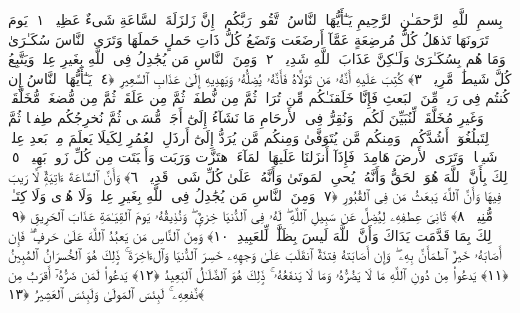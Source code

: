 
  
    
  
    
    

\nopagebreak
  بِسمِ ٱللَّهِ ٱلرَّحمَـٰنِ ٱلرَّحِيمِ
  يَـٰٓأَيُّهَا ٱلنَّاسُ ٱتَّقُوا۟ رَبَّكُم ۚ إِنَّ زَلزَلَةَ ٱلسَّاعَةِ شَىءٌ عَظِيمٌۭ ﴿١﴾
 يَومَ تَرَونَهَا تَذهَلُ كُلُّ مُرضِعَةٍ عَمَّآ أَرضَعَت وَتَضَعُ كُلُّ ذَاتِ حَملٍ حَملَهَا وَتَرَى ٱلنَّاسَ سُكَـٰرَىٰ وَمَا هُم بِسُكَـٰرَىٰ وَلَـٰكِنَّ عَذَابَ ٱللَّهِ شَدِيدٌۭ ﴿٢﴾
 وَمِنَ ٱلنَّاسِ مَن يُجَٰدِلُ فِى ٱللَّهِ بِغَيرِ عِلمٍۢ وَيَتَّبِعُ كُلَّ شَيطَٰنٍۢ مَّرِيدٍۢ ﴿٣﴾
 كُتِبَ عَلَيهِ أَنَّهُۥ مَن تَوَلَّاهُ فَأَنَّهُۥ يُضِلُّهُۥ وَيَهدِيهِ إِلَىٰ عَذَابِ ٱلسَّعِيرِ ﴿٤﴾
 يَـٰٓأَيُّهَا ٱلنَّاسُ إِن كُنتُم فِى رَيبٍۢ مِّنَ ٱلبَعثِ فَإِنَّا خَلَقنَـٰكُم مِّن تُرَابٍۢ ثُمَّ مِن نُّطفَةٍۢ ثُمَّ مِن عَلَقَةٍۢ ثُمَّ مِن مُّضغَةٍۢ مُّخَلَّقَةٍۢ وَغَيرِ مُخَلَّقَةٍۢ لِّنُبَيِّنَ لَكُم ۚ وَنُقِرُّ فِى ٱلأَرحَامِ مَا نَشَآءُ إِلَىٰٓ أَجَلٍۢ مُّسَمًّۭى ثُمَّ نُخرِجُكُم طِفلًۭا ثُمَّ لِتَبلُغُوٓا۟ أَشُدَّكُم ۖ وَمِنكُم مَّن يُتَوَفَّىٰ وَمِنكُم مَّن يُرَدُّ إِلَىٰٓ أَرذَلِ ٱلعُمُرِ لِكَيلَا يَعلَمَ مِنۢ بَعدِ عِلمٍۢ شَيـًۭٔا ۚ وَتَرَى ٱلأَرضَ هَامِدَةًۭ فَإِذَآ أَنزَلنَا عَلَيهَا ٱلمَآءَ ٱهتَزَّت وَرَبَت وَأَنۢبَتَت مِن كُلِّ زَوجٍۭ بَهِيجٍۢ ﴿٥﴾
 ذَٟلِكَ بِأَنَّ ٱللَّهَ هُوَ ٱلحَقُّ وَأَنَّهُۥ يُحىِ ٱلمَوتَىٰ وَأَنَّهُۥ عَلَىٰ كُلِّ شَىءٍۢ قَدِيرٌۭ ﴿٦﴾
 وَأَنَّ ٱلسَّاعَةَ ءَاتِيَةٌۭ لَّا رَيبَ فِيهَا وَأَنَّ ٱللَّهَ يَبعَثُ مَن فِى ٱلقُبُورِ ﴿٧﴾
 وَمِنَ ٱلنَّاسِ مَن يُجَٰدِلُ فِى ٱللَّهِ بِغَيرِ عِلمٍۢ وَلَا هُدًۭى وَلَا كِتَـٰبٍۢ مُّنِيرٍۢ ﴿٨﴾
 ثَانِىَ عِطفِهِۦ لِيُضِلَّ عَن سَبِيلِ ٱللَّهِ ۖ لَهُۥ فِى ٱلدُّنيَا خِزىٌۭ ۖ وَنُذِيقُهُۥ يَومَ ٱلقِيَـٰمَةِ عَذَابَ ٱلحَرِيقِ ﴿٩﴾
 ذَٟلِكَ بِمَا قَدَّمَت يَدَاكَ وَأَنَّ ٱللَّهَ لَيسَ بِظَلَّٰمٍۢ لِّلعَبِيدِ ﴿١٠﴾
 وَمِنَ ٱلنَّاسِ مَن يَعبُدُ ٱللَّهَ عَلَىٰ حَرفٍۢ ۖ فَإِن أَصَابَهُۥ خَيرٌ ٱطمَأَنَّ بِهِۦ ۖ وَإِن أَصَابَتهُ فِتنَةٌ ٱنقَلَبَ عَلَىٰ وَجهِهِۦ خَسِرَ ٱلدُّنيَا وَٱلءَاخِرَةَ ۚ ذَٟلِكَ هُوَ ٱلخُسرَانُ ٱلمُبِينُ ﴿١١﴾
 يَدعُوا۟ مِن دُونِ ٱللَّهِ مَا لَا يَضُرُّهُۥ وَمَا لَا يَنفَعُهُۥ ۚ ذَٟلِكَ هُوَ ٱلضَّلَـٰلُ ٱلبَعِيدُ ﴿١٢﴾
 يَدعُوا۟ لَمَن ضَرُّهُۥٓ أَقرَبُ مِن نَّفعِهِۦ ۚ لَبِئسَ ٱلمَولَىٰ وَلَبِئسَ ٱلعَشِيرُ ﴿١٣﴾
